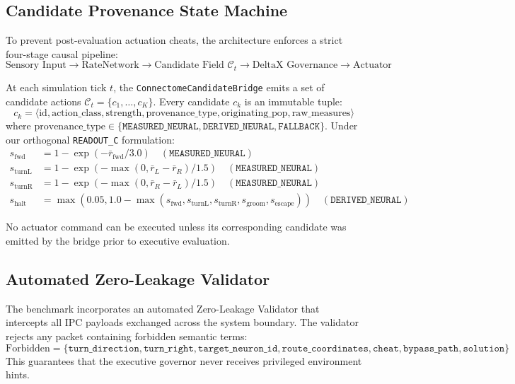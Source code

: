 \documentclass{article}
\begin{document}
\subsection{Candidate Provenance State Machine}

To prevent post-evaluation actuation cheats, the architecture enforces a strict four-stage causal pipeline:
\begin{equation}
\text{Sensory Input} \longrightarrow \text{RateNetwork} \longrightarrow \text{Candidate Field } \mathcal{C}_t \longrightarrow \text{DeltaX Governance} \longrightarrow \text{Actuator}
\end{equation}

At each simulation tick $t$, the \texttt{ConnectomeCandidateBridge} emits a set of candidate actions $\mathcal{C}_t = \{c_1, \dots, c_K\}$. Every candidate $c_k$ is an immutable tuple:
\begin{equation}
c_k = \langle \text{id}, \text{action\_class}, \text{strength}, \text{provenance\_type}, \text{originating\_pop}, \text{raw\_measures} \rangle
\end{equation}
where $\text{provenance\_type} \in \{\texttt{MEASURED\_NEURAL}, \texttt{DERIVED\_NEURAL}, \texttt{FALLBACK}\}$. Under our orthogonal \texttt{READOUT\_C} formulation:
\begin{align}
s_{\text{fwd}} &= 1 - \exp(-\bar{r}_{\text{fwd}} / 3.0) \quad (\texttt{MEASURED\_NEURAL}) \\
s_{\text{turnL}} &= 1 - \exp(-\max(0, \bar{r}_L - \bar{r}_R) / 1.5) \quad (\texttt{MEASURED\_NEURAL}) \\
s_{\text{turnR}} &= 1 - \exp(-\max(0, \bar{r}_R - \bar{r}_L) / 1.5) \quad (\texttt{MEASURED\_NEURAL}) \\
s_{\text{halt}} &= \max\left(0.05, 1.0 - \max(s_{\text{fwd}}, s_{\text{turnL}}, s_{\text{turnR}}, s_{\text{groom}}, s_{\text{escape}})\right) \quad (\texttt{DERIVED\_NEURAL})
\end{align}

No actuator command can be executed unless its corresponding candidate was emitted by the bridge prior to executive evaluation.

\subsection{Automated Zero-Leakage Validator}

The benchmark incorporates an automated Zero-Leakage Validator that intercepts all IPC payloads exchanged across the system boundary. The validator rejects any packet containing forbidden semantic terms:
\begin{equation}
\text{Forbidden} = \{\texttt{turn\_direction}, \texttt{turn\_right}, \texttt{target\_neuron\_id}, \texttt{route\_coordinates}, \texttt{cheat}, \texttt{bypass\_path}, \texttt{solution}\}
\end{equation}
This guarantees that the executive governor never receives privileged environment hints.
\end{document}
